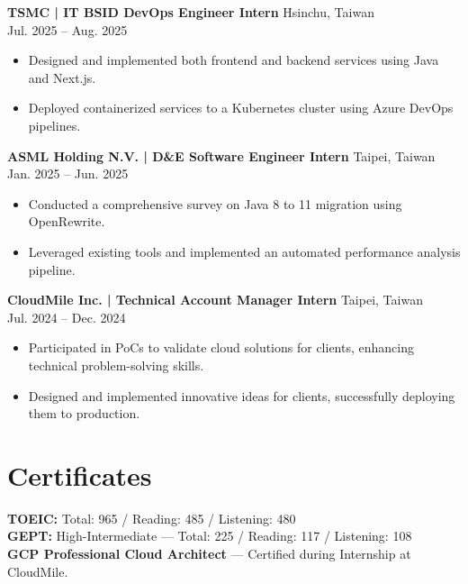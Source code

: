 \documentclass[10pt,a4paper]{article}
\begin{document}
\textbf{TSMC | IT BSID DevOps Engineer Intern} \hfill Hsinchu, Taiwan \\
\hfill Jul. 2025 -- Aug. 2025
\begin{itemize}
  \item Designed and implemented both frontend and backend services using Java and Next.js.
  \item Deployed containerized services to a Kubernetes cluster using Azure DevOps pipelines.
\end{itemize}

\textbf{ASML Holding N.V. | D\&E Software Engineer Intern} \hfill Taipei, Taiwan \\
\hfill Jan. 2025 -- Jun. 2025
\begin{itemize}
  \item Conducted a comprehensive survey on Java 8 to 11 migration using OpenRewrite.
  \item Leveraged existing tools and implemented an automated performance analysis pipeline.
\end{itemize}

\textbf{CloudMile Inc. | Technical Account Manager Intern} \hfill Taipei, Taiwan \\
\hfill Jul. 2024 -- Dec. 2024
\begin{itemize}
  \item Participated in PoCs to validate cloud solutions for clients, enhancing technical problem-solving skills.
  \item Designed and implemented innovative ideas for clients, successfully deploying them to production.
\end{itemize}

\section*{Certificates}
\textbf{TOEIC:} Total: 965 / Reading: 485 / Listening: 480 \\
\textbf{GEPT:} High-Intermediate --- Total: 225 / Reading: 117 / Listening: 108 \\
\textbf{GCP Professional Cloud Architect} --- Certified during Internship at CloudMile.
\end{document}
